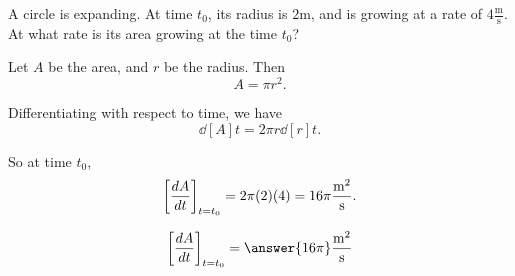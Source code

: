 \documentclass{ximera}
\author{Steven Gubkin}
\begin{document}
\begin{exercise}

A circle is expanding.  At time $t_0$, its radius is $2 \textrm{m}$,
and is growing at a rate of $4 \frac{\textrm{m}}{\textrm{s}}$.  At
what rate is its area growing at the time $t_0$?

\begin{hint}
  Let $A$ be the area, and $r$ be the radius.  Then
  \[
  A = \pi r^2.
  \]
\end{hint}

\begin{hint}
  Differentiating with respect to time, we have
  \[
  \dd[A]{t} = 2\pi r \dd[r]{t}.
  \]
\end{hint}

\begin{hint}
  So at time $t_0$,
  \[
  \eval{\dd[A]{t}}_{t = t_0} = 2 \pi (2) (4) = 16 \pi\frac{\textrm{m}^2}{\textrm{s}}.
  \]
\end{hint}

\begin{prompt}
  \[
  \eval{\dd[A]{t}}_{t = t_0} = \answer{16\pi}\frac{\textrm{m}^2}{\textrm{s}}
  \]
\end{prompt}

\end{exercise}
\end{document}
